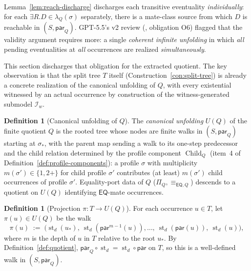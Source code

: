 \documentclass[11pt]{article}
\theoremstyle{definition}
\newtheorem{definition}[theorem]{Definition}
\theoremstyle{remark}
\newcommand{\EQ}{\mathsf{EQ}}
\newcommand{\st}{\operatorname{st}}
\newcommand{\Child}{\operatorname{Child}}
\newcommand{\eqQ}{\equiv_{\EQ,Q}}
\begin{document}
Lemma~\ref{lem:reach-discharge} discharges each transitive
eventuality \emph{individually}: for each $\exists R.D \in
\lambda_Q(\sigma)$ separately, there is a mate-class source from
which $D$ is reachable in $(S,\mathsf{par}_Q)$.  GPT-5.5's v2 review
(\cite{GPT55V2Review}, obligation O6) flagged that the validity
argument requires more: a single \emph{coherent infinite unfolding}
in which \emph{all} pending eventualities at \emph{all} occurrences
are realized \emph{simultaneously}.

This section discharges that obligation for the extracted quotient.
The key observation is that the split tree $T$ itself
(Construction~\ref{con:split-tree}) is already a concrete realization
of the canonical unfolding of $Q$, with every existential witnessed
by an actual occurrence by construction of the witness-generated
submodel $\mathcal{I}_w$.

\begin{definition}[Canonical unfolding of $Q$]\label{def:canonical-unfolding}
The \emph{canonical unfolding} $U(Q)$ of the finite quotient $Q$ is
the rooted tree whose nodes are finite walks in $(S,\mathsf{par}_Q)$
starting at $\sigma_\ast$, with the parent map sending a walk to its
one-step predecessor and the child relation determined by the
profile component $\Child_Q$ (item~4 of
Definition~\ref{def:profile-components}): a profile $\sigma$ with
multiplicity $m(\sigma') \in \{1,2{+}\}$ for child profile $\sigma'$
contributes (at least) $m(\sigma')$ child occurrences of profile
$\sigma'$.  Equality-port data of $Q$ ($\Pi_Q,\eqQ$) descends to a
quotient on $U(Q)$ identifying $\EQ$-mate occurrences.
\end{definition}

\begin{definition}[Projection $\pi : T \to U(Q)$]
\label{def:projection}
For each occurrence $u\in T$, let $\pi(u)\in U(Q)$ be the walk
\[
\pi(u) \;:=\; \bigl(\st_d(u_\ast),\ \st_d(\mathsf{par}^{m-1}(u)),\ldots,\
\st_d(\mathsf{par}(u)),\ \st_d(u)\bigr),
\]
where $m$ is the depth of $u$ in $T$ relative to the root $u_\ast$.
By Definition~\ref{def:quotient}, $\mathsf{par}_Q\circ\st_d =
\st_d\circ\mathsf{par}$ on $T$, so this is a well-defined walk in
$(S,\mathsf{par}_Q)$.
\end{definition}
\end{document}
